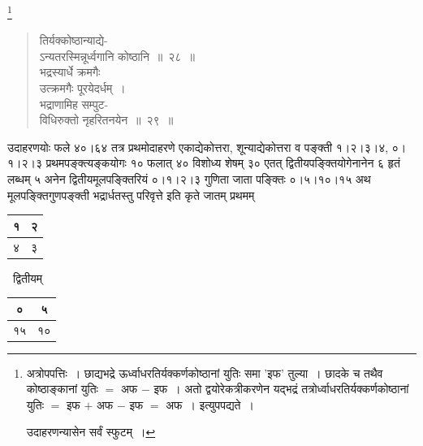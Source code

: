 \documentclass[11pt, openany]{book}
\begin{document}
\renewcommand{\thefootnote}{}\footnote{अत्रोपपत्तिः~। छाद्यभद्रे ऊर्ध्वाधरतिर्यक्कर्णकोष्ठानां युतिः समा 'इफ' तुल्या~। छादके च तथैव कोष्ठाङ्कानां युतिः $=$ अफ $-$ इफ~। अतो द्वयोरेकत्रीकरणेन यद्भद्रं तत्रोर्ध्वाधरतिर्यक्कर्णकोष्ठानां युतिः $=$ इफ $+$ अफ $-$ इफ $=$ अफ~। इत्युपपद्यते~।
\vspace{1mm}

\hspace{3mm} उदाहरणन्यासेन सर्वं स्फुटम्~।}

\newpage

\begin{quote}
{\gk तिर्यक्कोष्ठान्याद्ये-\\
ऽन्यतरस्मिन्नूर्ध्वगानि कोष्ठानि~॥~२८~॥\\
भद्रस्यार्धे क्रमगैः\\
उत्क्रमगैः पूरयेदर्धम्~।\\
भद्राणामिह सम्पुट-\\
विधिरुक्तो नृहरितनयेन~॥~२९~॥}	
\end{quote}

उदाहरणयोः फले ४०।६४ तत्र प्रथमोदाहरणे एकाद्येकोत्तरा, शून्याद्येकोत्तरा व पङ्क्ती १।२।३।४, ०।१।२।३ प्रथमपङ्क्त्यङ्कयोगः १० फलात् ४० विशोध्य शेषम् ३० एतत् द्वितीयपङ्क्तियोगेनानेन ६ हृतं लब्धम् ५ अनेन द्वितीयमूलपङ्क्तिरियं ०।१।२।३ गुणिता जाता पङ्क्तिः ०।५।१०।१५ अथ मूलपङ्क्तिगुणपङ्क्ती भद्रार्धतस्तु परिवृत्ते इति कृते जातम् प्रथमम्~ \begin{tabular}{|c|c|}
	\hline
१ & २\\
\hline
४ & ३\\
\hline
\end{tabular}
 ~द्वितीयम्~ 
\begin{tabular}{|c|c|}
\hline
० & ५\\
\hline
१५ & १०\\
\hline
\end{tabular}
\end{document}
